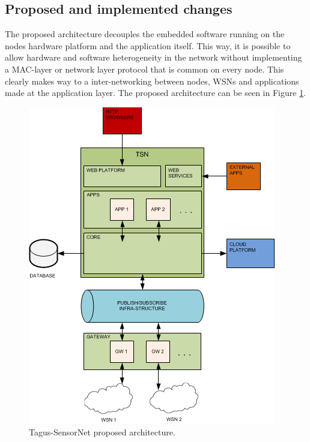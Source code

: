 \subsection{Proposed and implemented changes}
The proposed architecture decouples the embedded software running on the nodes hardware platform and the application itself. This way, it is possible to allow hardware and software heterogeneity in the network without implementing a MAC-layer or network layer protocol that is common on every node. This clearly makes way to a inter-networking between nodes, WSNs and applications made at the application layer. The proposed architecture can be seen in Figure \ref{tsnng}.

\begin{figure}[!htb]
\begin{center}
\includegraphics[scale=0.5]{./images/37-ttsp-tsn_ng.png}
\end{center}
\caption{Tagus-SensorNet proposed architecture.}
\label{tsnng}
\end{figure}

